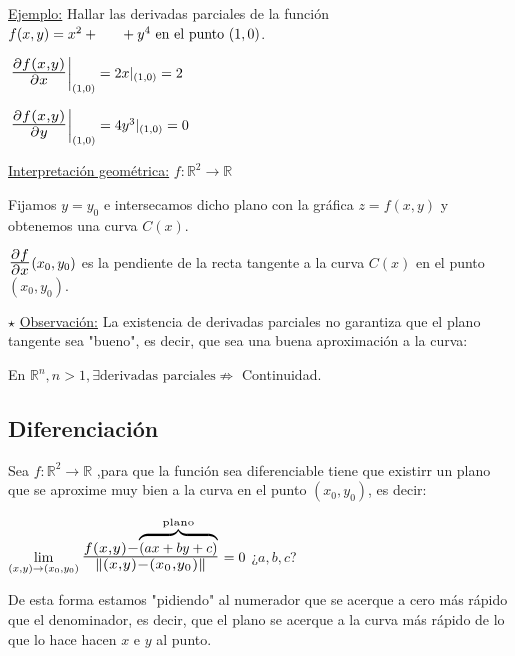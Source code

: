 \documentclass[12pt, titlepage]{article}
\newcommand{\R}{\mathbb{R}}
\newcommand{\bfrac}[2]{\scalebox{1.4}{$\frac{#1}{#2}$}}
\newcommand{\observacion}{\noindent$\star$ \underline{Observación:} }
\begin{document}
\underline{Ejemplo:} Hallar las derivadas parciales de la función $f (x, y) = x^2 + \vspace{1mm} \\ \indent 
+ y^4 \text{ en el punto } (1, 0)$.
\vspace{3mm}

$\left.\bfrac{\partial f(x, y)}{\partial x}\right |_{(1, 0)} = 2x |_{(1, 0)} = 2$

$\left.\bfrac{\partial f(x, y)}{\partial y}\right |_{(1, 0)} = 4y^3 |_{(1, 0)} = 0$
\vspace{5mm}

\noindent\underline{Interpretación geométrica:} $f : \R^2 \to \R$
\vspace{3mm}

Fijamos $y = y_0$ e intersecamos dicho plano con la gráfica $z = f (x, y)$ y obtenemos una curva $C (x)$.

$\bfrac{\partial f}{\partial x} (x_0, y_0)$ es la pendiente de la recta tangente a la curva $C (x)$ en el punto 
$(x_0, y_0)$.
\vspace{3mm}

\observacion La existencia de derivadas parciales no garantiza que el plano tangente sea "bueno", es decir, 
que sea una buena aproximación a la curva:
\vspace{3mm}

En $\R^n, n >1, \exists \text{derivadas parciales} \not\Rightarrow$ Continuidad.
\vspace{5mm}


\subsection{Diferenciación}
\vspace{3mm}

Sea $f : \R^2 \to \R$ ,para que la función sea diferenciable tiene que existirr un plano que se aproxime muy 
bien a la curva en el punto $(x_0, y_0)$, es decir:
\vspace{3mm}

$\displaystyle \lim_{(x, y) \to (x_0, y_0)} \bfrac{f (x, y) - \overbrace{\scalebox{0.7}{$(ax +by + c)$}}
^{\text{plano}}}{\| (x, y) - (x_0, y_0)\|} = 0$ ¿$a, b, c$?
\vspace{3mm}

De esta forma estamos "pidiendo" al numerador que se acerque a cero más rápido que el denominador, es decir, que el plano se acerque a la curva más rápido de lo que lo hace hacen $x$ e $y$ al punto.
\vspace{3mm}
\end{document}

